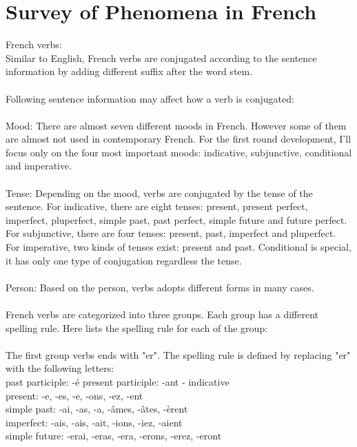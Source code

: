 \documentclass[11pt,letterpaper]{article}
\begin{document}
\section{Survey of Phenomena in French}
French verbs:\\
Similar to English, French verbs are conjugated according to the sentence information by adding different suffix after the word stem.\\
\\
Following sentence information may affect how a verb is conjugated:\\
\\
\indent Mood: There are almost seven different moods in French. However some of them are almost not used in contemporary French. For the first round development, I'll focus only on the four most important moods: indicative, subjunctive, conditional and imperative.\\
\\
\indent Tense: Depending on the mood, verbs are conjugated by the tense of the sentence. For indicative, there are eight tenses: present, present perfect, imperfect, pluperfect, simple past, past perfect, simple future and future perfect. For subjunctive, there are four tenses: present, past, imperfect and pluperfect. For imperative, two kinds of tenses exist: present and past. Conditional is special, it has only one type of conjugation regardless the tense.\\
\\
\indent Person: Based on the person, verbs adopts different forms in many cases.\\
\\
French verbs are categorized into three groups. Each group has a different spelling rule. Here lists the spelling rule for each of the group:\\
\\
\indent The first group verbs ends with "er". The spelling rule is defined by replacing "er" with the following letters:\\
\indent past participle: -\'e
\indent present participle: -ant
\indent - indicative\\
\indent\indent present: -e, -es, -e, -ons, -ez, -ent\\
\indent\indent simple past: -ai, -as, -a, -\^ames, -\^ates, -\`erent\\
\indent\indent imperfect: -ais, -ais, -ait, -ions, -iez, -aient\\
\indent\indent simple future: -erai, -eras, -era, -erons, -erez, -eront\\
\end{document}
